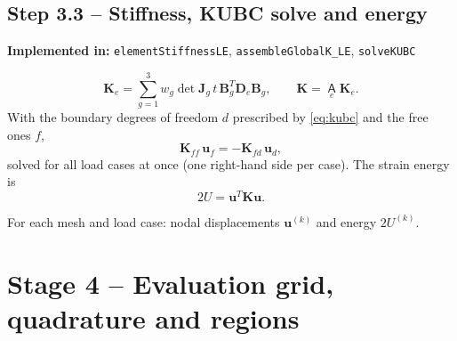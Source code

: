 \documentclass[11pt,a4paper]{article}
\newcommand{\Dm}{\mathbf{D}}                    %
\newcommand{\bu}{\bm{u}}
\newcommand{\bK}{\bm{K}}
\newcommand{\code}[1]{\texttt{#1}}
\theoremstyle{plain}
\theoremstyle{remark}
\newcommand{\implementedin}[1]{\begin{codebox}\textbf{Implemented in:} #1\end{codebox}}
\begin{document}
\subsection*{Step 3.3 -- Stiffness, KUBC solve and energy}
\implementedin{\code{elementStiffnessLE}, \code{assembleGlobalK\_LE}, \code{solveKUBC}}
\begin{equation}
  \bK_e=\sum_{g=1}^3w_g\det\bm J_g\,t\,\bm B_g^T\Dm_e\bm B_g,\qquad
  \bK=\operatorname*{\mathsf{A}}_e\bK_e .
  \label{eq:K}
\end{equation}
With the boundary degrees of freedom $d$ prescribed by \eqref{eq:kubc} and the free ones $f$,
\begin{equation}
  \bK_{ff}\,\bu_f=-\bK_{fd}\,\bu_d ,
  \label{eq:solve}
\end{equation}
solved for all load cases at once (one right-hand side per case). The strain energy is
\begin{equation}
  2U=\bu^T\bK\bu .
  \label{eq:energy}
\end{equation}
\begin{delivers}
For each mesh and load case: nodal displacements $\bu^{(k)}$ and energy $2U^{(k)}$.
\end{delivers}

\section{Stage 4 -- Evaluation grid, quadrature and regions}
\label{sec:stage4}
\end{document}

